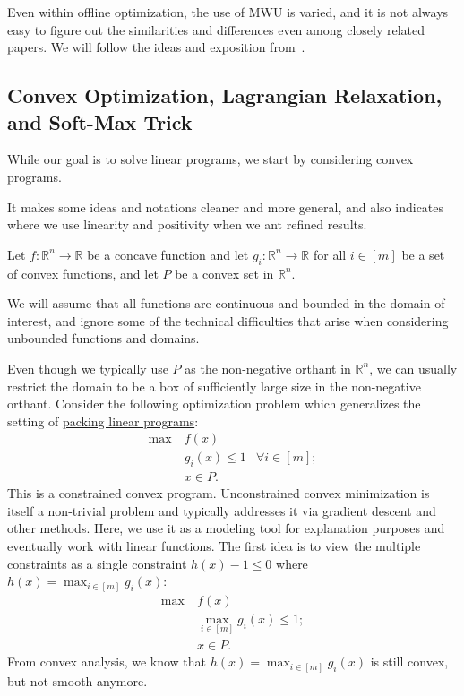 Even within offline optimization, the use of MWU is varied, and it is not always easy to figure out the similarities and differences even among closely related papers. We will follow the ideas and exposition from~\cite{chekuri2015multiplicative}.

\subsection{Convex Optimization, Lagrangian Relaxation, and Soft-Max Trick}
While our goal is to solve linear programs, we start by considering convex programs.

\begin{intuition}
	It makes some ideas and notations cleaner and more general, and also indicates where we use linearity and positivity when we ant refined results.
\end{intuition}

Let \(f \colon \mathbb{R} ^n \to \mathbb{R} \) be a concave function and let \(g_i \colon \mathbb{R} ^n \to \mathbb{R} \) for all \(i \in [m]\) be a set of convex functions, and let \(P\) be a convex set in \(\mathbb{R} ^n\).

\begin{note}
	We will assume that all functions are continuous and bounded in the domain of interest, and ignore some of the technical difficulties that arise when considering unbounded functions and domains.
\end{note}

Even though we typically use \(P\) as the non-negative orthant in \(\mathbb{R} ^n\), we can usually restrict the domain to be a box of sufficiently large size in the non-negative orthant. Consider the following optimization problem which generalizes the setting of \hyperref[def:packing-LP]{packing linear programs}:
\[
	\begin{aligned}
		\max~ & f(x)                                 \\
		      & g_i (x) \leq 1 & \forall i \in [m] ; \\
		      & x\in P.
	\end{aligned}
\]
This is a constrained convex program. Unconstrained convex minimization is itself a non-trivial problem and typically addresses it via gradient descent and other methods. Here, we use it as a modeling tool for explanation purposes and eventually work with linear functions. The first idea is to view the multiple constraints as a single constraint \(h(x) - 1 \leq 0\) where \(h(x) = \max _{i \in [m]} g_i(x)\):
\[
	\begin{aligned}
		\max~ & f(x)                               \\
		      & \max _{i \in [m]} g_i (x) \leq 1 ; \\
		      & x\in P.
	\end{aligned}
\]
From convex analysis, we know that \(h(x) = \max _{i \in [m]}g_i(x)\) is still convex, but not smooth anymore.


